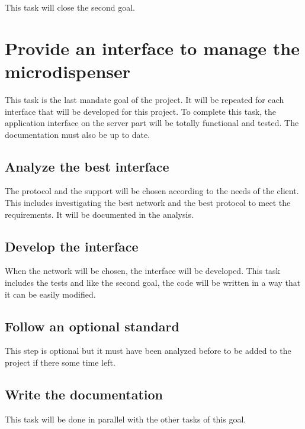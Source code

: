 This task will close the second goal.


\section{Provide an interface to manage the microdispenser}
\label{sec:activities:interface}

This task is the last mandate goal of the project.
It will be repeated for each interface that will be developed for this project.
To complete this task, the application interface on the server part will be totally functional and tested.
The documentation must also be up to date.

\subsection{Analyze the best interface}
\label{sec:activities:interface:network}

The protocol and the support will be chosen according to the needs of the client.
This includes investigating the best network and the best protocol to meet the requirements.
It will be documented in the analysis.


\subsection{Develop the interface}
\label{sec:activities:interface:develop}

When the network will be chosen, the interface will be developed.
This task includes the tests and like the second goal, the code will be written in a way that it can be easily modified.

\subsection{Follow an optional standard}
\label{sec:activities:interface:standard}

This step is optional but it must have been analyzed before to be added to the project if there some time left.

\subsection{Write the documentation}
\label{sec:activities:interface:documentation}

This task will be done in parallel with the other tasks of this goal.

